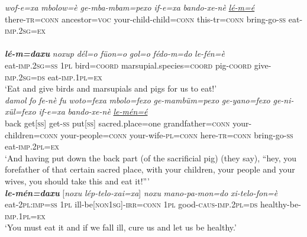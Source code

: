 \documentclass[output=paper]{LSP/langsci}
\begin{document}
\begin{exe}
\ex \label{Devex:07ae}
\begin{xlist}
\ex \label{Devex:07a}						
\gll \textit{wof-e=xa} \textit{mbolow=è}  \textit{ge-mba-mbam=pexo} \textit{if-e=xa} \textit{bando-xe-nè} \textit{\underline{lé-m=é}}\\
there-\textsc{tr=conn} ancestor=\textsc{voc} your-child-child=\textsc{conn} this-tr=\textsc{conn}   bring-go-\textsc{ss} eat-\textsc{imp.2sg=ex}\\
\glt {}\\

\ex \label{Devex:07b}						
\gll \textbf{\textit{lé-m=daxu}} \textit{noxup} \textit{dél=o} \textit{füon=o} \textit{gol=o} \textit{fédo-m=do} \textit{le-fén=è}\\
eat-\textsc{imp.2sg=ss} \textsc{1pl} bird=\textsc{coord} marsupial.species=\textsc{coord} pig-\textsc{coord} give-\textsc{imp.2sg=ds} eat-\textsc{imp.1pl=ex}\\
\glt `Eat and give birds and marsupials and pigs for us to eat!'\\ 

\ex \label{Devex:07c}						
\gll \textit{damol} \textit{fo} \textit{fe-nè} \textit{fu} \textit{woto=fexa} \textit{mbolo=fexo} \textit{ge-mambüm=pexo} 	\textit{ge-yano=fexo} \textit{ge-ni-xül=fexo} \textit{if-e=xa} \textit{bando-xe-nè} \textit{\underline{le-mén=é}}\\
back get[\textsc{ss}] get-\textsc{ss} put[\textsc{ss}] sacred.place=one grandfather\textsc{=conn} 	your-children=\textsc{conn} your-people=\textsc{conn} your-wife-\textsc{pl=conn} here-\textsc{tr=conn} bring-go-\textsc{ss} eat-\textsc{imp.2pl=ex}\\
\glt `And having put down the back part (of the sacrificial pig) (they say), ``hey, you forefather of that certain sacred place, with your children, your people and your wives, you should take this and eat it!{''}'\\

\ex \label{Devex:07d}						
\gll \textbf{\textit{le-mén=daxu}} [\textit{noxu}  \textit{lép-telo-xai=xa}] \textit{noxu} \textit{mano-pa-mon=do} \textit{xi-telo-fon=è}\\
eat-\textsc{2pl:imp=ss} \textsc{1pl} ill-be\textsc{[non1sg]-irr=conn} \textsc{1pl} good-\textsc{caus-imp.2pl=ds} healthy-be-\textsc{imp.1pl=ex}\\
\glt `You must eat it and if we fall ill, cure us and let us be healthy.' \citep[][159--162]{enk97}

\end{xlist}
\end{exe}
\end{document}
